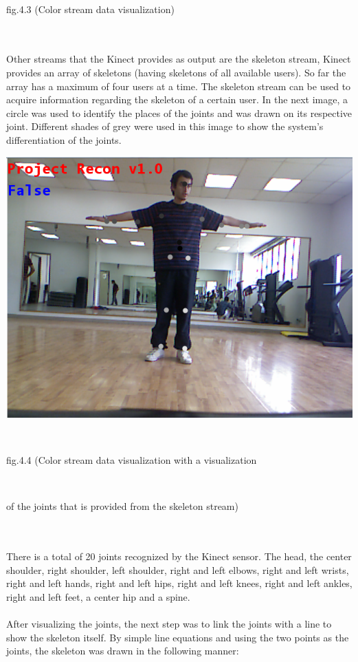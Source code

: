 \\
\centerline{fig.4.3 (Color stream data visualization)}
\\
\\
Other streams that the Kinect provides as output are the skeleton stream, Kinect provides an array of skeletons (having skeletons of all available users). So far the array has a maximum of four users at a time. The skeleton stream can be used to acquire information regarding the skeleton of a certain user. In the next image, a circle was used to identify the places of the joints and was drawn on its respective joint. Different shades of grey were used in this image to show the system's differentiation of the joints.
\\
\centerline{\includegraphics[scale=0.5]{color_joints.png}}
\\
\centerline{fig.4.4 (Color stream data visualization with a visualization}
\\
\centerline{of the joints that is provided from the skeleton stream)}
\\
\\
There is a total of 20 joints recognized by the Kinect sensor. The head, the center shoulder, right shoulder, left shoulder, right and left elbows, right and left wrists, right and left hands, right and left hips, right and left knees, right and left ankles, right and left feet, a center hip and a spine.
\\
\\
After visualizing the joints, the next step was to link the joints with a line to show the skeleton itself. By simple line equations and using the two points as the joints, the skeleton was drawn in the following manner:
